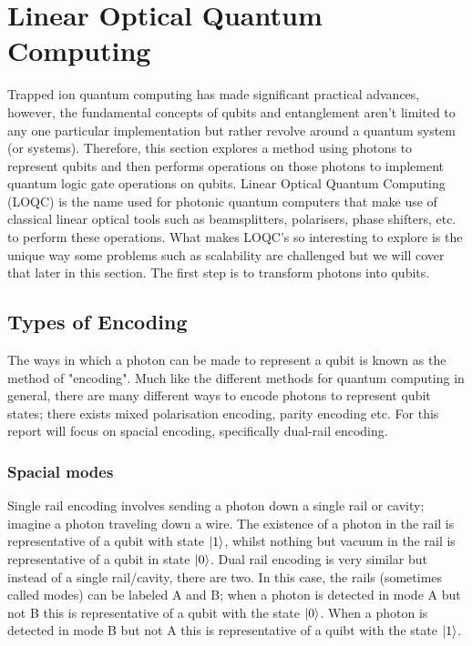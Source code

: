 
\section{Linear Optical Quantum Computing}\label{sec:Photonic}
Trapped ion quantum computing has made significant practical advances, however, the fundamental concepts of qubits and entanglement aren't limited to any one particular implementation but rather revolve around a quantum system (or systems). Therefore, this section explores a method using photons to represent qubits and then performs operations on those photons to implement quantum logic gate operations on qubits. Linear Optical Quantum Computing (LOQC) is the name used for photonic quantum computers that make use of classical linear optical tools such as beamsplitters, polarisers, phase shifters, etc. to perform these operations. What makes LOQC's so interesting to explore is the unique way some problems such as scalability are challenged but we will cover that later in this section. The first step is to transform photons into qubits.

\subsection{Types of Encoding}
The ways in which a photon can be made to represent a qubit is known as the method of "encoding". Much like the different methods for quantum computing in general, there are many different ways to encode photons to represent qubit states; there exists mixed polarisation encoding, parity encoding etc. For this report will focus on spacial encoding, specifically dual-rail encoding. 

\subsubsection{Spacial modes}\label{sec:modes}
Single rail encoding involves sending a photon down a single rail or cavity; imagine a photon traveling down a wire. The existence of a photon in the rail is representative of a qubit with state $\ket{1}$, whilst nothing but vacuum in the rail is representative of a qubit in state $\ket{0}$. Dual rail encoding is very similar but instead of a single rail/cavity, there are two. In this case, the rails (sometimes called modes) can be labeled A and B; when a photon is detected in mode A but not B this is representative of a qubit with the state $\ket{0}$. When a photon is detected in mode B but not A this is representative of a quibt with the state $\ket{1}$. 

